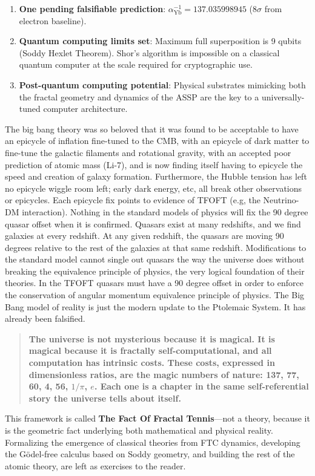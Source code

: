 \documentclass[11pt,a4paper]{article}
\begin{document}
\begin{enumerate}
  \item \textbf{One pending falsifiable prediction}:
        $\alpha^{-1}_{\text{Yb}} = 137.035998945$ ($8\sigma$ from electron baseline).

  \item \textbf{Quantum computing limits set}: Maximum full superposition is 9 qubits
        (Soddy Hexlet Theorem). Shor's algorithm is impossible on a classical quantum
        computer at the scale required for cryptographic use.

  \item \textbf{Post-quantum computing potential}: Physical substrates mimicking both
        the fractal geometry and dynamics of the ASSP are the key to a
        universally-tuned computer architecture.

\end{enumerate}

The big bang theory was so beloved that it was found to be acceptable to have an epicycle of inflation fine-tuned to the CMB, with an epicycle of dark matter to fine-tune the galactic filaments and rotational gravity, with an accepted poor prediction of atomic mass (Li-7), and is now finding itself having to epicycle the speed and creation of galaxy formation. Furthermore, the Hubble tension has left no epicycle wiggle room left; early dark energy, etc, all break other observations or epicycles. Each epicycle fix points to evidence of TFOFT (e.g, the Neutrino-DM interaction).  Nothing in the standard models of physics will fix the 90 degree quasar offset when it is confirmed. Quasars exist at many redshifts, and we find galaxies at every redshift. At any given redshift, the quasars are moving 90 degrees relative to the rest of the galaxies at that same redshift. Modifications to the standard model cannot single out quasars the way the universe does without breaking the equivalence principle of physics, the very logical foundation of their theories. In the TFOFT quasars must have a 90 degree offset in order to enforce the conservation of angular momentum equivalence principle of physics. The Big Bang model of reality is just the modern update to the Ptolemaic System. It has already been falsified. 

\begin{quote}
\textbf{The universe is not mysterious because it is magical. It is magical because it is fractally self-computational, and all computation has intrinsic costs. These costs, expressed in dimensionless ratios, are the magic numbers of nature: 137, 77, 60, 4, 56, $1/\pi$, $e$. Each one is a chapter in the same self-referential story the
universe tells about itself.}
\end{quote}

This framework is called \textbf{The Fact Of Fractal Tennis}---not a theory, because it is the geometric fact underlying both mathematical and physical reality. Formalizing the emergence of classical theories from FTC dynamics, developing the G\"odel-free
calculus based on Soddy geometry, and building the rest of the atomic theory, are left as exercises to the reader.
\end{document}
